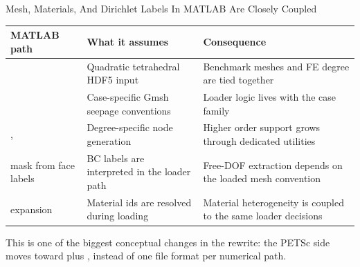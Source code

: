 \documentclass[aspectratio=169,10pt]{beamer}
\begin{document}
\begin{frame}{Mesh, Materials, And Dirichlet Labels In MATLAB Are Closely Coupled}
\small
\begin{tabularx}{\textwidth}{p{}p{}Y}
\toprule
\textbf{MATLAB path} & \textbf{What it assumes} & \textbf{Consequence} \\
\midrule
{} & Quadratic tetrahedral HDF5 input & Benchmark meshes and FE degree are tied together \\
 & Case-specific Gmsh seepage conventions & Loader logic lives with the case family \\
,  & Degree-specific node generation & Higher order support grows through dedicated utilities \\
 mask from face labels & BC labels are interpreted in the loader path & Free-DOF extraction depends on the loaded mesh convention \\
 expansion & Material ids are resolved during loading & Material heterogeneity is coupled to the same loader decisions \\
\bottomrule
\end{tabularx}
\vspace{0.18cm}
\begin{callout}
This is one of the biggest conceptual changes in the rewrite: the PETSc side moves toward  plus , instead of one file format per numerical path.
\end{callout}
\end{frame}
\end{document}
